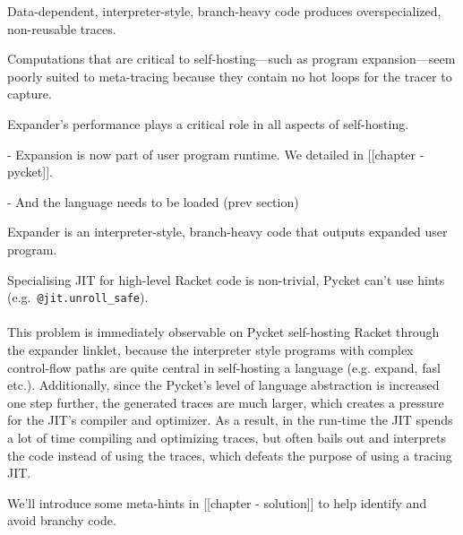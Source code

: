 		\begin{sectionpoint}
			Data-dependent, interpreter-style, branch-heavy code produces overspecialized, non-reusable traces.

			Computations that are critical to self-hosting—such as program expansion—seem poorly suited to meta-tracing because they contain no hot loops for the tracer to capture.
		\end{sectionpoint}

		\begin{paragraph-here}
			Expander's performance plays a critical role in all aspects of self-hosting.

				- Expansion is now part of user program runtime. We detailed in [[chapter - pycket]].

				- And the language needs to be loaded (prev section)
		\end{paragraph-here}

		\begin{paragraph-here}
			Expander is an interpreter-style, branch-heavy code that outputs expanded user program.
		\end{paragraph-here}

		\begin{paragraph-here}
			Specialising JIT for high-level Racket code is non-trivial, Pycket can't use hints (e.g.\ \verb|@jit.unroll_safe|).
		\end{paragraph-here}

		\paragraph{}%
		This problem is immediately observable on Pycket self-hosting Racket
		through the expander linklet, because the interpreter style programs
		with complex control-flow paths are quite central in self-hosting a
		language (e.g. expand, fasl etc.). Additionally, since the Pycket's
		level of language abstraction is increased one step further, the
		generated traces are much larger, which creates a pressure for the
		JIT's compiler and optimizer. As a result, in the run-time the JIT
		spends a lot of time compiling and optimizing traces, but often bails
		out and interprets the code instead of using the traces, which defeats
		the purpose of using a tracing JIT.

		\begin{paragraph-here}
			We'll introduce some meta-hints in [[chapter - solution]] to help identify and avoid branchy code.
		\end{paragraph-here}


